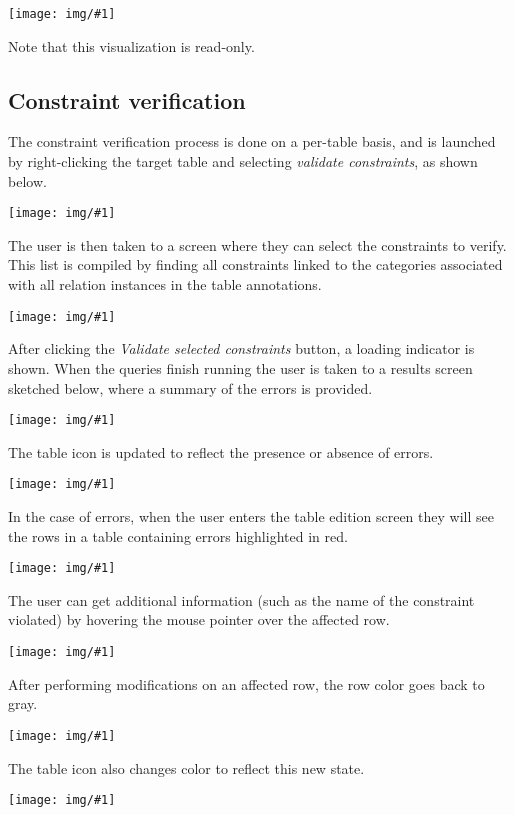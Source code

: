 \documentclass[a4paper, 10pt]{article}
\newcommand{\img}[2]{
  \begin{center}
    \texttt{[image: img/\#1]}
  \end{center}
}
\begin{document}
\img{constraint-visualization.png}{12cm}

Note that this visualization is read-only.

\subsection{Constraint verification}

The constraint verification process is done on a per-table basis, and is
launched by right-clicking the target table and selecting \textit{validate
constraints}, as shown below.

\img{validate-constraints-menu-item.png}{5cm}

The user is then taken to a screen where they can select the constraints to
verify. This list is compiled by finding all constraints linked to the
categories associated with all relation instances in the table annotations.

\img{constraint-selection.png}{12cm}

After clicking the \textit{Validate selected constraints} button, a loading
indicator is shown. When the queries finish running the user is taken to a
results screen sketched below, where a summary of the errors is provided.

\img{validation-results-summary.png}{8cm}

The table icon is updated to reflect the presence or absence of errors.

\img{table-pin-error.png}{5cm}

In the case of errors, when the user enters the table edition screen they will
see the rows in a table containing errors highlighted in red.

\img{edit-annotation.png}{12cm}

The user can get additional information (such as the name of the constraint
violated) by hovering the mouse pointer over the affected row.

\img{validation-results-details.png}{12cm}

After performing modifications on an affected row, the row color goes back to
gray.

\img{validation-results-after-modifications.png}{12cm}

The table icon also changes color to reflect this new state.

\img{table-pin-after-modifications.png}{5cm}

\end{document}

